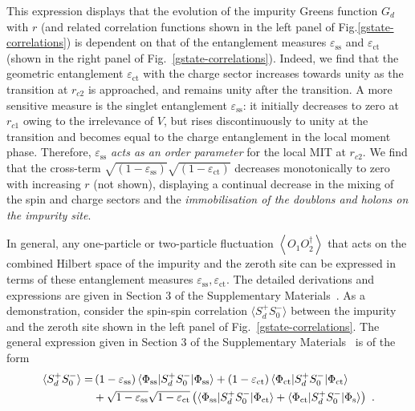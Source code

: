 \documentclass{iopart}
\begin{document}
This expression displays that the evolution of the impurity Greens function $G_{d}$ 
with $r$ (and related correlation functions shown in the left panel of Fig.\eqref{gstate-correlations}) is dependent on that of the entanglement measures $\varepsilon_{\text{ss}}$ and $\varepsilon_{\text{ct}}$ (shown in the right panel of Fig.~\eqref{gstate-correlations}). 
Indeed, we find that the geometric entanglement \(\varepsilon_\text{ct}\) with the charge sector increases towards unity as the transition at \(r_{c2}\) is approached, and remains unity after the transition. A more sensitive measure is the singlet entanglement \(\varepsilon_\text{ss}\): it initially decreases to zero at \(r_{c1}\) owing to the irrelevance of \(V\), but rises discontinuously to unity at the transition and becomes equal to the charge entanglement in the local moment phase.
Therefore, \(\varepsilon_\text{ss}\) {\it acts as an order parameter} for the local MIT at \(r_{c2}\). We find that the cross-term \(\sqrt{\left(1 - \varepsilon_\text{ss} \right)}\sqrt{\left(1 - \varepsilon_\text{ct} \right)}\) decreases monotonically to zero with increasing \(r\) (not shown), displaying a continual decrease in the mixing of the spin and charge sectors and the {\it immobilisation of the doublons and holons on the impurity site}. 

In general, any one-particle or two-particle fluctuation \(\left<O_1 O_2^\dagger \right>\) that acts on the combined Hilbert space of the impurity and the zeroth site can be expressed in terms of these entanglement measures \(\varepsilon_\text{ss},\varepsilon_\text{ct}\). The detailed derivations and expressions are given in Section 3 of the Supplementary Materials~\cite{supp_mat}. As a demonstration, consider the spin-spin correlation $\langle S_{d}^{+}S_{0}^{-}\rangle$ between the impurity and the zeroth site shown in the left panel of Fig.~\eqref{gstate-correlations}. The general expression given in Section 3 of the Supplementary Materials~\cite{supp_mat} is of the form
\begin{eqnarray}
	\braket{S_{d}^{+}S_{0}^{-}} =& \left(1 - \varepsilon_\text{ss}\right) \braket{\Phi_\text{ss} | S_d^+ S_0^- | \Phi_\text{ss}} + \left(1 - \varepsilon_\text{ct}\right) \braket{\Phi_\text{ct} | S_d^+ S_0^- | \Phi_\text{ct}} \nonumber \\
				      &+ \sqrt{1 - \varepsilon_\text{ss}}\sqrt{1 - \varepsilon_\text{ct}}\left(\braket{\Phi_\text{ss} | S_d^+ S_0^- | \Phi_\text{ct}} + \braket{\Phi_\text{ct} | S_d^+ S_0^- | \Phi_\text{s}}\right)~.
\end{eqnarray}
\end{document}
